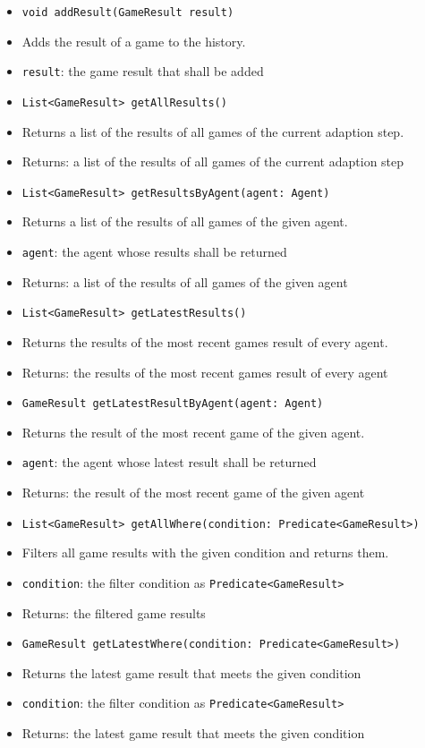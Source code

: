 \documentclass[parskip=full,11pt]{scrartcl}
\begin{document}
\begin{itemize}\itemsep -10pt
	\item \texttt{void addResult(GameResult result)}
	\item[] Adds the result of a game to the history.
	\item[] \texttt{result}: the game result that shall be added
	\item \texttt{List<GameResult> getAllResults()}
	\item[] Returns a list of the results of all games of the current adaption step.
	\item[]Returns: a list of the results of all games of the current adaption step
	\item \texttt{List<GameResult> getResultsByAgent(agent: Agent)}
	\item[] Returns a list of the results of all games of the given agent.
	\item[] \texttt{agent}: the agent whose results shall be returned
	\item[]Returns: a list of the results of all games of the given agent
	\item \texttt{List<GameResult> getLatestResults()}
	\item[] Returns the results of the most recent games result of every agent.
	\item[]Returns: the results of the most recent games result of every agent
	\item \texttt{GameResult getLatestResultByAgent(agent: Agent)}
	\item[] Returns the result of the most recent game of the given agent.
	\item[] \texttt{agent}: the agent whose latest result shall be returned
	\item[]Returns: the result of the most recent game of the given agent
	\item \texttt{List<GameResult> getAllWhere(condition: Predicate<GameResult>)}
	\item[] Filters all game results with the given condition and returns them.
	\item[]\texttt{condition}: the filter condition as \texttt{Predicate<GameResult>}
	\item[]Returns: the filtered game results
	\item \texttt{GameResult getLatestWhere(condition: Predicate<GameResult>)}
	\item[] Returns the latest game result that meets the given condition
	\item[]\texttt{condition}: the filter condition as \texttt{Predicate<GameResult>}
	\item[]Returns: the latest game result that meets the given condition
\end{itemize}
\end{document}
